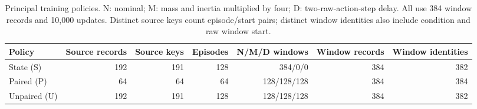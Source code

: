 \begin{table}[t]
\centering
\caption{Principal training policies. N: nominal; M: mass and inertia multiplied by four; D: two-raw-action-step delay. All use 384 window records and 10,000 updates. Distinct source keys count episode/start pairs; distinct window identities also include condition and raw window start.}
\label{tab:data}
\footnotesize
\setlength{\tabcolsep}{5pt}
\renewcommand{\arraystretch}{1.12}
\begin{tabular}{lrrrrrr}
\toprule
Policy & Source records & Source keys & Episodes & N/M/D windows & Window records & Window identities \\
\midrule
State (S) & 192 & 191 & 128 & 384/0/0 & 384 & 382 \\
Paired (P) & 64 & 64 & 64 & 128/128/128 & 384 & 384 \\
Unpaired (U) & 192 & 191 & 128 & 128/128/128 & 384 & 382 \\
\bottomrule
\end{tabular}
\end{table}
